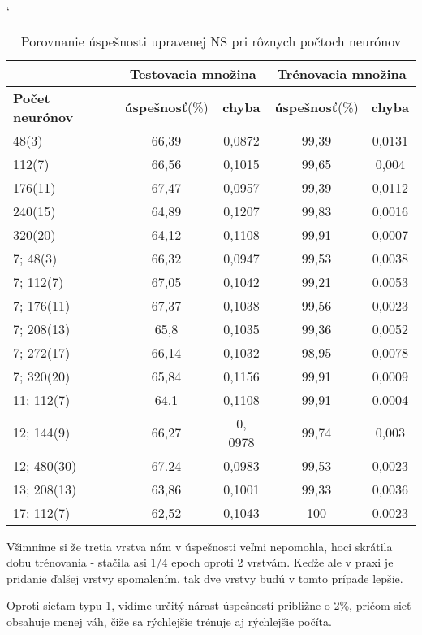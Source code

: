 \begin{table}[htp]
\catcode` %
\centering
\begin{tabular}{|l|c|c|c|c|}
\cline{2-5}
\multicolumn{1}{l}{} & \multicolumn{2}{|c|}{\textbf{Testovacia množina}} & \multicolumn{2}{c|}{\textbf{Trénovacia množina}}\\ 
\hline
\textbf{Počet neurónov} & \textbf{úspešnosť}(\%) & \textbf{chyba} & \textbf{úspešnosť}(\%) & \textbf{chyba} \\ \hline
48(3)& 66,39 & 0,0872 & 99,39 & 0,0131 \\ \hline
112(7)& 66,56 & 0,1015 & 99,65 & 0,004 \\ \hline 
176(11)& 67,47 & 0,0957 & 99,39 & 0,0112 \\ \hline
240(15)& 64,89 & 0,1207 & 99,83 & 0,0016 \\ \hline
320(20)& 64,12 & 0,1108 & 99,91 & 0,0007 \\ \hline
7; 48(3)& 66,32 & 0,0947 & 99,53 & 0,0038 \\ \hline 
7; 112(7)& 67,05 & 0,1042 & 99,21 & 0,0053 \\ \hline 
7; 176(11)& 67,37 & 0,1038 & 99,56 & 0,0023 \\ \hline
7; 208(13)& 65,8  & 0,1035 & 99,36 & 0,0052 \\ \hline 
7; 272(17)& 66,14 & 0,1032 & 98,95 & 0,0078 \\ \hline 
7; 320(20)& 65,84& 0,1156 & 99,91 & 0,0009\\ \hline 
11; 112(7)& 64,1 & 0,1108 & 99,91 & 0,0004 \\ \hline
12; 144(9)& 66,27 & 0, 0978 & 99,74 & 0,003 \\ \hline
12; 480(30)& 67.24 & 0,0983 & 99,53 & 0,0023 \\ \hline 
13; 208(13)& 63,86 & 0,1001 & 99,33 & 0,0036 \\ \hline 
17; 112(7)& 62,52 & 0,1043 & 100 & 0,0023 \\ \hline
\end{tabular}
\caption{Porovnanie úspešnosti upravenej NS pri rôznych počtoch neurónov}
\label{tab:neuroncountcmp2}
\end{table}

Všimnime si že tretia vrstva nám v úspešnosti veľmi nepomohla, hoci skrátila dobu trénovania - stačila asi 1/4 epoch oproti 2 vrstvám. Keďže ale v praxi je pridanie ďalšej vrstvy spomalením, tak dve vrstvy budú v tomto prípade lepšie.

Oproti sieťam typu 1, vidíme určitý nárast úspešností približne o 2\%, pričom sieť obsahuje menej váh, čiže sa rýchlejšie trénuje aj rýchlejšie počíta.

